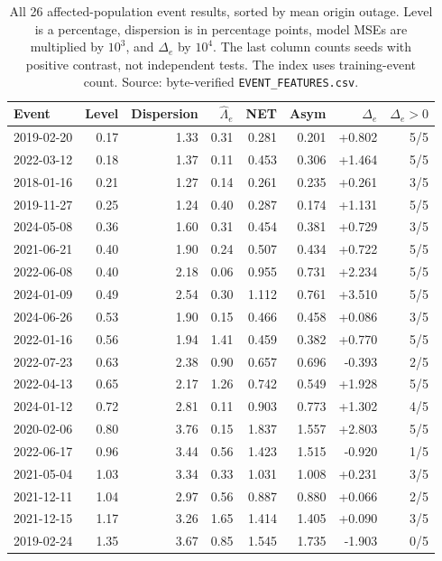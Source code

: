 \begin{table}[htbp]
\centering\small
\caption{All 26 affected-population event results, sorted by mean origin outage. Level is a percentage, dispersion is in percentage points, model MSEs are multiplied by $10^3$, and $\Delta_e$ by $10^4$. The last column counts seeds with positive contrast, not independent tests. The index uses training-event count. Source: byte-verified \texttt{EVENT\_FEATURES.csv}.}
\label{tab:eventfull}
\begin{tabular}{@{}lrrrrrrr@{}}\toprule
Event & Level & Dispersion & $\widehat\Lambda_e$ & NET & Asym & $\Delta_e$ & $\Delta_e>0$\\\midrule
2019-02-20 & 0.17 & 1.33 & 0.31 & 0.281 & 0.201 & +0.802 & 5/5 \\
2022-03-12 & 0.18 & 1.37 & 0.11 & 0.453 & 0.306 & +1.464 & 5/5 \\
2018-01-16 & 0.21 & 1.27 & 0.14 & 0.261 & 0.235 & +0.261 & 3/5 \\
2019-11-27 & 0.25 & 1.24 & 0.40 & 0.287 & 0.174 & +1.131 & 5/5 \\
2024-05-08 & 0.36 & 1.60 & 0.31 & 0.454 & 0.381 & +0.729 & 3/5 \\
2021-06-21 & 0.40 & 1.90 & 0.24 & 0.507 & 0.434 & +0.722 & 5/5 \\
2022-06-08 & 0.40 & 2.18 & 0.06 & 0.955 & 0.731 & +2.234 & 5/5 \\
2024-01-09 & 0.49 & 2.54 & 0.30 & 1.112 & 0.761 & +3.510 & 5/5 \\
2024-06-26 & 0.53 & 1.90 & 0.15 & 0.466 & 0.458 & +0.086 & 3/5 \\
2022-01-16 & 0.56 & 1.94 & 1.41 & 0.459 & 0.382 & +0.770 & 5/5 \\
2022-07-23 & 0.63 & 2.38 & 0.90 & 0.657 & 0.696 & -0.393 & 2/5 \\
2022-04-13 & 0.65 & 2.17 & 1.26 & 0.742 & 0.549 & +1.928 & 5/5 \\
2024-01-12 & 0.72 & 2.81 & 0.11 & 0.903 & 0.773 & +1.302 & 4/5 \\
2020-02-06 & 0.80 & 3.76 & 0.15 & 1.837 & 1.557 & +2.803 & 5/5 \\
2022-06-17 & 0.96 & 3.44 & 0.56 & 1.423 & 1.515 & -0.920 & 1/5 \\
2021-05-04 & 1.03 & 3.34 & 0.33 & 1.031 & 1.008 & +0.231 & 3/5 \\
2021-12-11 & 1.04 & 2.97 & 0.56 & 0.887 & 0.880 & +0.066 & 2/5 \\
2021-12-15 & 1.17 & 3.26 & 1.65 & 1.414 & 1.405 & +0.090 & 3/5 \\
2019-02-24 & 1.35 & 3.67 & 0.85 & 1.545 & 1.735 & -1.903 & 0/5 \\

\end{tabular}
\end{table}
